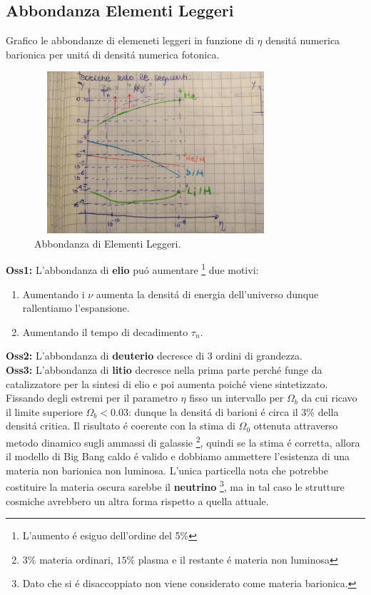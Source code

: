 \documentclass[12pt, a4paper]{article}
\begin{document}
\subsection{Abbondanza Elementi Leggeri}
Grafico le abbondanze di elemeneti leggeri in funzione di $\eta$ densit\'{a} numerica barionica per unit\'{a} di densit\'{a} numerica fotonica.\\
\begin{figure}[htp]
    \centering
    \includegraphics[width=9cm, height=6cm]{images/leggeri.jpeg}
    \caption{Abbondanza di Elementi Leggeri.}
    \label{fig:leggeri}
\end{figure}
\textbf{Oss1:}  L'abbondanza di \textbf{elio} pu\'{o} aumentare \footnote{L'aumento \'{e} esiguo dell'ordine del 5$\%$} due motivi:\\
\begin{enumerate}
\item  Aumentando i $\nu$ aumenta la densit\'{a} di energia dell'universo dunque rallentiamo l'espansione.
\item Aumentando il tempo di decadimento $\tau_n$.
\end{enumerate}
\textbf{Oss2:} L'abbondanza di \textbf{deuterio} decresce di 3 ordini di grandezza.\\
\textbf{Oss3:} L'abbondanza di \textbf{litio} decresce nella prima parte perch\'{e} funge da catalizzatore per la sintesi di elio e poi aumenta poich\'{e} viene sintetizzato.\\
Fissando degli estremi per il parametro $\eta$ fisso un intervallo per  $\Omega_b$ da cui ricavo il limite superiore $\Omega_b<0.03$: dunque la densit\'{a} di barioni \'{e} circa il $3\%$ della densit\'{a} critica. Il risultato \'{e} coerente con la stima di $\Omega_0$ ottenuta attraverso metodo dinamico sugli ammassi di galassie \footnote{ $3\%$ materia ordinari, $15\%$ plasma e il restante \'{e} materia non luminosa}, quindi se la stima \'{e} corretta, allora il modello di Big Bang caldo \'{e} valido e dobbiamo ammettere l'esistenza di una materia non barionica non luminosa. L'unica particella nota che potrebbe costituire la materia oscura sarebbe il \textbf{neutrino} \footnote{ Dato che si \'{e} disaccoppiato non viene considerato come materia barionica.}, ma in tal caso le strutture cosmiche avrebbero un altra forma rispetto a quella attuale.
\end{document}
